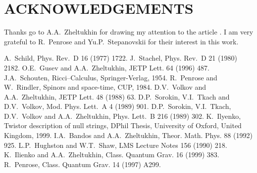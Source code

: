 \documentclass[a4paper,twocolumn,showkeys,showpacs,aps]{revtex4}
\begin{document}
\section{ACKNOWLEDGEMENTS}

Thanks go to A.A.~Zheltukhin for drawing my attention to the
article \cite{Gusev-Zheltukhin}. I am very grateful to R.~Penrose
and Yu.P.~Stepanovskii for their interest in this work.

\begin{thebibliography}{99}
   A.~Schild, Phys. Rev.~D 16 (1977) 1722.
  J.~Stachel, Phys. Rev.~D 21 (1980) 2182.
 O.E.~Gusev and A.A.~Zheltukhin,
                   JETP Lett. 64 (1996) 487.
 J.A.~Schouten, Ricci--Calculus,
                   Springer-Ver\-lag, 1954.
      R.~Penrose and W.~Rindler, Spinors and
                   space-time, CUP, 1984.
                   D.V.~Volkov and A.A.~Zheltukhin, JETP Lett.
                   48 (1988) 63.
                   D.P.~Sorokin, V.I.~Tkach and D.V.~Volkov, Mod.
                   Phys. Lett.~A 4 (1989) 901.
                   D.P.~Sorokin, V.I.~Tkach, D.V.~Volkov and
                   A.A.~Zhel\-tu\-khin, Phys. Lett.~B 216 (1989) 302.
   K.~Ilyenko, Twistor description of
                   null strings, DPhil Thesis, University of Oxford,
                   United Kingdom, 1999.
 I.A.~Bandos and A.A.~Zheltukhin,
                   Theor. Math. Phys. 88 (1992) 925.
 L.P.~Hughston and W.T.~Shaw, LMS Lecture Notes 156
                   (1990) 218.
 K.~Ilienko and A.A.~Zheltukhin, Class. Quantum Grav.
                   16 (1999) 383.
 R.~Penrose, Class. Quantum Grav. 14 (1997) A299.
\end{thebibliography}
\end{document}
